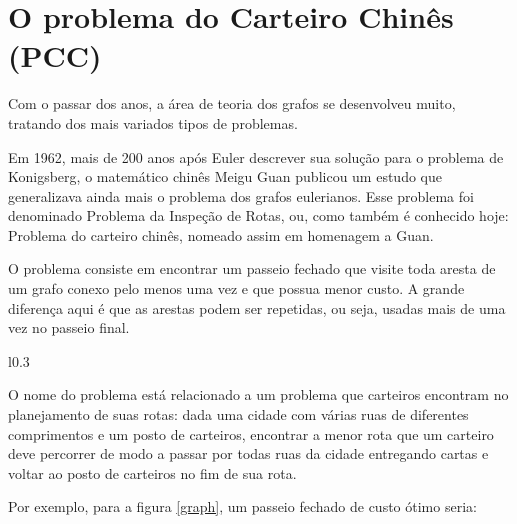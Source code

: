 \section{O problema do Carteiro Chinês (PCC)}

Com o passar dos anos, a área de teoria dos grafos se desenvolveu muito, tratando dos mais variados tipos de problemas.

Em 1962, mais de 200 anos após Euler descrever sua solução para o problema de Konigsberg, o matemático chinês Meigu Guan publicou um estudo que generalizava ainda mais o problema dos grafos eulerianos. 
Esse problema foi denominado Problema da Inspeção de Rotas, ou, como também é conhecido hoje: Problema do carteiro chinês, nomeado assim em homenagem a Guan.

O problema consiste em encontrar um passeio fechado que visite toda aresta de um grafo conexo pelo menos uma vez e que possua menor custo. 
A grande diferença aqui é que as arestas podem ser repetidas, ou seja, usadas mais de uma vez no passeio final.

\begin{wrapfigure}{l}{0.3\textwidth} 
    \centering
	\caption{Exemplo}
	\label{graph}
\end{wrapfigure}

O nome do problema está relacionado a um problema que carteiros encontram no planejamento de suas rotas: dada uma cidade com várias ruas de diferentes comprimentos e um posto de carteiros, encontrar a menor rota que um carteiro deve percorrer de modo a passar por todas ruas da cidade entregando cartas e voltar ao posto de carteiros no fim de sua rota.


Por exemplo, para a figura \ref{graph}, um passeio fechado de custo ótimo seria: 

